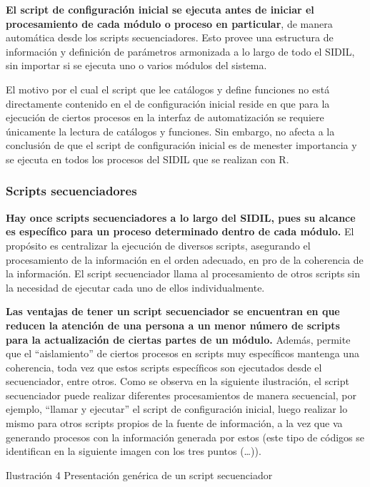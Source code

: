 \documentclass[
]{article}
\begin{document}
\textbf{El script de configuración inicial se ejecuta antes de iniciar el procesamiento de cada módulo o proceso en particular}, de manera automática desde los scripts secuenciadores. Esto provee una estructura de información y definición de parámetros armonizada a lo largo de todo el SIDIL, sin importar si se ejecuta uno o varios módulos del sistema.

El motivo por el cual el script que lee catálogos y define funciones no está directamente contenido en el de configuración inicial reside en que para la ejecución de ciertos procesos en la interfaz de automatización se requiere únicamente la lectura de catálogos y funciones. Sin embargo, no afecta a la conclusión de que el script de configuración inicial es de menester importancia y se ejecuta en todos los procesos del SIDIL que se realizan con R.

\hypertarget{secuenciadores}{%
\subsubsection{Scripts secuenciadores}\label{secuenciadores}}

\textbf{Hay once scripts secuenciadores a lo largo del SIDIL, pues su alcance es específico para un proceso determinado dentro de cada módulo.} El propósito es centralizar la ejecución de diversos scripts, asegurando el procesamiento de la información en el orden adecuado, en pro de la coherencia de la información. El script secuenciador llama al procesamiento de otros scripts sin la necesidad de ejecutar cada uno de ellos individualmente.

\textbf{Las ventajas de tener un script secuenciador se encuentran en que reducen la atención de una persona a un menor número de scripts para la actualización de ciertas partes de un módulo.} Además, permite que el ``aislamiento'' de ciertos procesos en scripts muy específicos mantenga una coherencia, toda vez que estos scripts específicos son ejecutados desde el secuenciador, entre otros. Como se observa en la siguiente ilustración, el script secuenciador puede realizar diferentes procesamientos de manera secuencial, por ejemplo, ``llamar y ejecutar'' el script de configuración inicial, luego realizar lo mismo para otros scripts propios de la fuente de información, a la vez que va generando procesos con la información generada por estos (este tipo de códigos se identifican en la siguiente imagen con los tres puntos (\ldots)).

Ilustración 4 Presentación genérica de un script secuenciador
\end{document}
